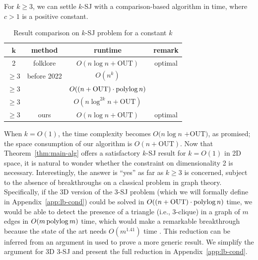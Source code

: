 \documentclass[acmsmall,review,anonymous]{acmart}
\def\figcapup{\vspace{-2mm}}
\def\figcapdown{\vspace{-4mm}}
\def\out{\mathrm{OUT}}
\begin{document}
\begin{theorem} \label{thm:main-alg}
    For $k \ge 3$, we can settle $k$-SJ with a comparison-based algorithm in
    \myeqn{
        O( c^k \cdot (k!)^3 \cdot (n \log n + k \cdot \out))
        \nn
    }
    time, where $c > 1$ is a positive constant.
\end{theorem}


\begin{table}
    \begin{tabular}{c|c|c|c}
        $\bm{k}$ & {\bf method} & {\bf runtime} & {\bf remark} \\
        \hline\hline
        2 & folklore & $O(n \log n + \out)$ & optimal \\
        \hline
        $\ge 3$ & before 2022 & $O(n^k)$ &  \\
        $\ge 3$ & \cite{ty22} & $O((n + \out) \cdot \polylog n)$ & \\
        $\ge 3$ & \cite{kcko22} & $O(n \log^{2k} n + \out)$ & \\
        \hline
        $\ge 3$ & ours & $O(n \log n + \out)$ & optimal
    \end{tabular}

    \vspace{4mm}
    \figcapup
    \caption{Result comparison on $k$-SJ problem for a constant $k$}
    \label{tab:results-com}
    \figcapdown \vspace{-3mm}
\end{table}

When $k = O(1)$, the time complexity becomes $O(n \log n$ $+ \out)$, as promised; the space consumption of our algorithm is $O(n + \out)$. Now that Theorem~\ref{thm:main-alg} offers a satisfactory $k$-SJ result for $k = O(1)$ in 2D space, it is natural to wonder whether the constraint on dimensionality 2 is necessary. Interestingly, the answer is ``yes'' as far as $k \ge 3$ is concerned, subject to the absence of breakthroughs on a classical problem in graph theory. Specifically, if the 3D version of the 3-SJ problem (which we will formally define in Appendix~\ref{app:lb-cond}) could be solved in $O((n + \out) \cdot \polylog n)$ time, we would be able to detect the presence of a triangle (i.e., 3-clique) in a graph of $m$ edges in $O(m \operatorname*{polylog} m)$ time, which would make a remarkable breakthrough because the state of the art needs $O(m^{1.41})$ time \cite{ayz97}. This reduction can be inferred from an argument in \cite{kcko22} used to prove a more generic result. We simplify the argument for 3D 3-SJ and present the full reduction in Appendix~\ref{app:lb-cond}.
\end{document}
